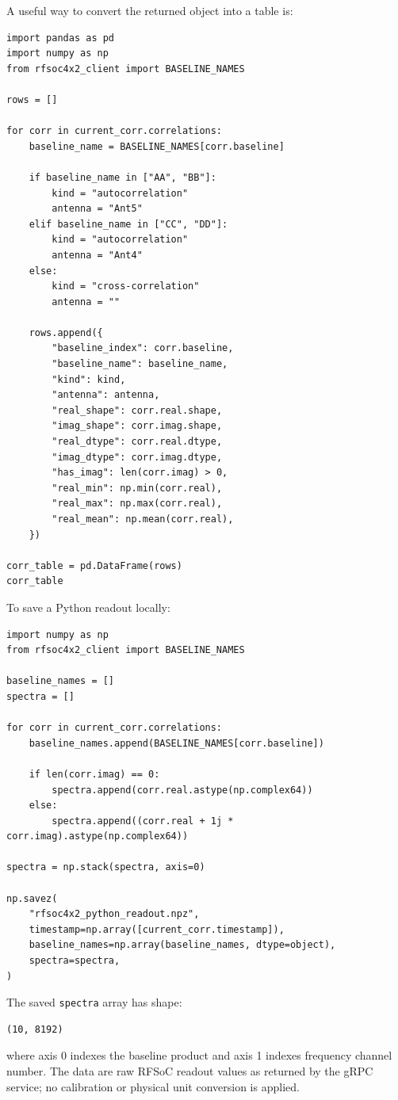 \documentclass[12pt]{extarticle}
\begin{document}
A useful way to convert the returned object into a table is:
\begin{lstlisting}
import pandas as pd
import numpy as np
from rfsoc4x2_client import BASELINE_NAMES

rows = []

for corr in current_corr.correlations:
    baseline_name = BASELINE_NAMES[corr.baseline]

    if baseline_name in ["AA", "BB"]:
        kind = "autocorrelation"
        antenna = "Ant5"
    elif baseline_name in ["CC", "DD"]:
        kind = "autocorrelation"
        antenna = "Ant4"
    else:
        kind = "cross-correlation"
        antenna = ""

    rows.append({
        "baseline_index": corr.baseline,
        "baseline_name": baseline_name,
        "kind": kind,
        "antenna": antenna,
        "real_shape": corr.real.shape,
        "imag_shape": corr.imag.shape,
        "real_dtype": corr.real.dtype,
        "imag_dtype": corr.imag.dtype,
        "has_imag": len(corr.imag) > 0,
        "real_min": np.min(corr.real),
        "real_max": np.max(corr.real),
        "real_mean": np.mean(corr.real),
    })

corr_table = pd.DataFrame(rows)
corr_table
\end{lstlisting}

To save a Python readout locally:
\begin{lstlisting}
import numpy as np
from rfsoc4x2_client import BASELINE_NAMES

baseline_names = []
spectra = []

for corr in current_corr.correlations:
    baseline_names.append(BASELINE_NAMES[corr.baseline])

    if len(corr.imag) == 0:
        spectra.append(corr.real.astype(np.complex64))
    else:
        spectra.append((corr.real + 1j * corr.imag).astype(np.complex64))

spectra = np.stack(spectra, axis=0)

np.savez(
    "rfsoc4x2_python_readout.npz",
    timestamp=np.array([current_corr.timestamp]),
    baseline_names=np.array(baseline_names, dtype=object),
    spectra=spectra,
)
\end{lstlisting}

The saved \texttt{spectra} array has shape:
\begin{lstlisting}
(10, 8192)
\end{lstlisting}
where axis 0 indexes the baseline product and axis 1 indexes frequency channel number. The data are raw RFSoC readout values as returned by the gRPC service; no calibration or physical unit conversion is applied.
\end{document}
